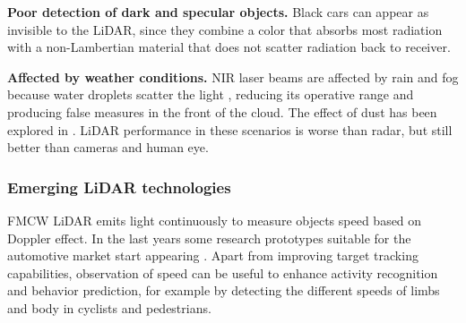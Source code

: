     \textbf{Poor detection of dark and specular objects.} Black cars
    can appear as invisible to the LiDAR, since they combine a color that
    absorbs most radiation with a non-Lambertian material that does not scatter
    radiation back to receiver.
    
    
    \textbf{Affected by weather conditions.} NIR laser
    beams are affected by rain and fog because water droplets scatter the light 
    \cite{Wang2008}, reducing its operative range and producing false measures 
    in the front of the cloud. The effect of dust has been
    explored in \cite{Phillips2017}. LiDAR performance in these scenarios is 
    worse than radar, but still better than cameras and human eye.

\subsubsection{Emerging LiDAR technologies}
\label{sec:03-lidar-emerging}


FMCW LiDAR \cite{Nordin2004} emits light continuously to measure objects speed
based on Doppler effect. In the last years some research prototypes suitable for
the automotive market start appearing \cite{Poulton2016}.
Apart from improving target tracking capabilities, observation of speed can
be useful to enhance activity recognition and behavior prediction, for example 
by detecting the different speeds of limbs and body in cyclists and pedestrians.


